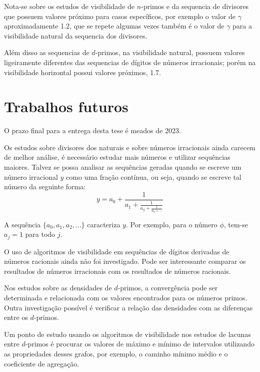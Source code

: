 \documentclass[12pt,a4paper,fleqn]{report}
\begin{document}
Nota-se sobre os estudos de visibilidade de $n$-primos e da sequencia de divisores
que possuem valores próximo para casos específicos, por exemplo o valor de $\gamma$
aproximadamente 1.2, que se repete algumas vezes também é o valor de $\gamma$ para
a visibilidade natural da sequencia dos divisores.

Além disso as sequencias de $d$-primos, na visibilidade natural, possuem valores ligeiramente diferentes das sequencias de dígitos de números irracionais; porém na visibilidade horizontal possui valores próximos, 1.7.



\section{Trabalhos futuros}

O prazo final para a entrega desta tese é meados de 2023.

Os estudos sobre divisores dos naturais e sobre números irracionais ainda carecem de melhor análise, é necessário estudar mais números e utilizar sequências maiores. Talvez se possa analisar as sequências geradas quando se escreve um número irracional $y$ como uma fração contínua, ou seja, quando se escreve tal número da seguinte forma:
\begin{equation*}
 y = a_0 + \frac{1}{a_1+\frac{1}{a_2+ \frac{1}{a_3+...}}}    
\end{equation*}

\noindent A sequência $\{a_0,a_1,a_2,...\}$ caracteriza $y$. Por exemplo, para o número $\phi$, tem-se $a_j=1$ para todo $j$.

O uso de algoritmos de visibilidade em sequências de dígitos derivadas de números
racionais ainda não foi investigado. Pode ser interessante comparar os resultados de números irracionais
com os resultados de números racionais.

Nos estudos sobre as densidades de $d$-primos, a convergência pode ser determinada e relacionada
com os valores encontrados para os números primos. Outra investigação possível é verificar a 
relação das densidades com as diferenças entre os $d$-primos.

Um ponto de estudo usando os algoritmos de visibilidade nos estudos de lacunas entre $d$-primos
é procurar os valores de máximo e mínimo de intervalos utilizando as propriedades desses grafos,
por exemplo, o caminho mínimo médio e o coeficiente de agregação.


\def \label{REFERÊNCIAS BIBLIOGRÁFICAS}
%


\end{document}
